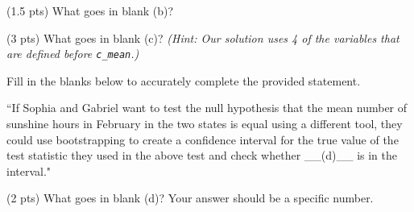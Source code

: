 \begin{prob}[(8 pts)]
\begin{subprobset}

\begin{subprob}(1.5 pts) What goes in blank (b)?

    
\end{subprob}

\begin{subprob}(3 pts) What goes in blank (c)? \textit{(Hint: Our solution uses 4 of the variables that are defined before \texttt{c\_mean}.)}

\begin{responsebox}{0.75in}
    
\end{responsebox}
    
\end{subprob}

\end{subprobset}

Fill in the blanks below to accurately complete the provided statement.

\begin{center}
``If Sophia and Gabriel want to test the null hypothesis that the mean number of sunshine hours in February in the two states is equal using a different tool, they could use bootstrapping to create a confidence interval for the true value of the test statistic they used in the above test and check whether \_\_(d)\_\_ is in the interval."

\end{center}

\begin{subprobset}

\begin{subprob}(2 pts) What goes in blank (d)? Your answer should be a specific number.

\inlineresponsebox[2in]{}{}
    
\end{subprob}

\end{subprobset}
    
\end{prob}

\newpage

